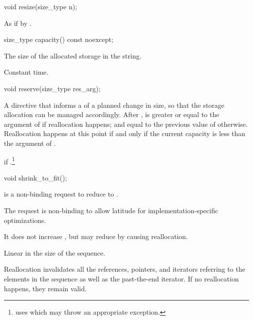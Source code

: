 %
\begin{itemdecl}
void resize(size_type n);
\end{itemdecl}

\begin{itemdescr}
\pnum
\effects
As if by .
\end{itemdescr}

%
\begin{itemdecl}
size_type capacity() const noexcept;
\end{itemdecl}

\begin{itemdescr}
\pnum
\returns
The size of the allocated storage in the string.

\pnum
\complexity Constant time.
\end{itemdescr}

%
\begin{itemdecl}
void reserve(size_type res_arg);
\end{itemdecl}

\begin{itemdescr}
\pnum
\effects
A directive that informs a  of a planned change in size,
so that the storage allocation can be managed accordingly.
After
,
is greater or equal to the argument of
if reallocation happens; and
equal to the previous value of
otherwise.
Reallocation happens at this point if and only if
the current capacity is less than the argument of .

\pnum
\throws
{}
if
.\footnote{
uses
which may throw an appropriate exception.}
\end{itemdescr}

%
\begin{itemdecl}
void shrink_to_fit();
\end{itemdecl}

\begin{itemdescr}
\pnum
\effects {} is a non-binding request to reduce
 to . \begin{note} The request is non-binding to
allow latitude for implementation-specific optimizations. \end{note}
It does not increase , but may reduce 
by causing reallocation.

\pnum
\complexity Linear in the size of the sequence.

\pnum
\remarks Reallocation invalidates all the references, pointers, and iterators
referring to the elements in the sequence as well as the past-the-end iterator.
If no reallocation happens, they remain valid.
\end{itemdescr}


